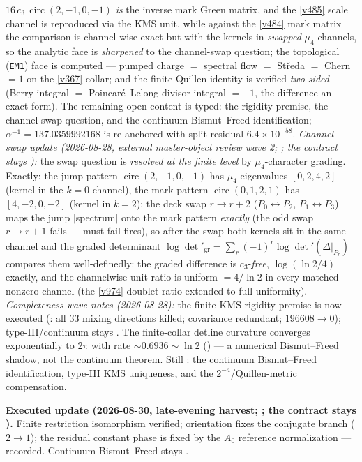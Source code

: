 \documentclass[11pt,a4paper]{article}
\newcommand{\cthree}{c_3}
\begin{document}
$16\,\cthree\,\operatorname{circ}(2,-1,0,-1)$ \emph{is} the inverse mark Green matrix, and the
\vref{v485} scale channel is reproduced via the KMS unit, while against the \vref{v484} mark
matrix the comparison is channel-wise exact but with the kernels in \emph{swapped} $\mu_4$
channels, so the analytic face is \emph{sharpened} to the channel-swap question; the
topological (\texttt{EM1}) face is computed --- pumped charge $=$ spectral flow $=$
St\v{r}eda $=$ Chern $=1$ on the \vref{v367} collar; and the finite Quillen identity is
verified \emph{two-sided} (Berry integral $=$ Poincar\'e--Lelong divisor integral $=+1$, the
difference an exact form). The remaining open content is typed: the rigidity premise, the
channel-swap question, and the continuum Bismut--Freed identification;
$\alpha^{-1}=137.0359992168$ is re-anchored with split residual $6.4\times10^{-58}$.
\emph{Channel-swap update (2026-08-28, external master-object review wave 2;
; the contract stays \mO):} the swap question is
\emph{resolved at the finite level} by $\mu_4$-character grading.  Exactly: the jump pattern
$\operatorname{circ}(2,-1,0,-1)$ has $\mu_4$ eigenvalues $[0,2,4,2]$ (kernel in the $k{=}0$
channel), the mark pattern $\operatorname{circ}(0,1,2,1)$ has $[4,-2,0,-2]$ (kernel in
$k{=}2$); the deck swap $r\to r{+}2$ ($P_0\leftrightarrow P_2$, $P_1\leftrightarrow P_3$) maps
the jump $|$spectrum$|$ onto the mark pattern \emph{exactly} (the odd swap $r\to r{+}1$ fails
--- must-fail fires), so after the swap both kernels sit in the same channel and the graded
determinant $\log\det'_{\mathrm{gr}}=\sum_r(-1)^r\log\det'(\Delta|_{P_r})$ compares them well-definedly:
the graded difference is $\cthree$-\emph{free}, $\log(\ln 2/4)$ exactly, and the channelwise
unit ratio is uniform $=4/\ln 2$ in every matched nonzero channel (the \vref{v974} doublet
ratio extended to full uniformity).  \emph{Completeness-wave notes (2026-08-28):} the finite
KMS rigidity premise is now executed
(: all $33$ mixing directions killed; covariance redundant;
$196608\to 0$); type-III/continuum stays \mO.  The finite-collar detline curvature converges
exponentially to $2\pi$ with rate $\sim 0.6936\sim\ln 2$
() --- a numerical Bismut--Freed shadow, not the continuum
theorem.  Still \mO: the continuum Bismut--Freed identification, type-III KMS uniqueness,
and the $2^{-4}$/Quillen-metric compensation.

\par\smallskip\noindent\textbf{Executed update (2026-08-30, late-evening harvest;
; the contract stays \mO).}
Finite restriction isomorphism verified; orientation fixes the conjugate branch
($2\to1$); the residual constant phase is fixed by the $A_0$ reference normalization ---
recorded.  Continuum Bismut--Freed stays \mO.
\end{document}
